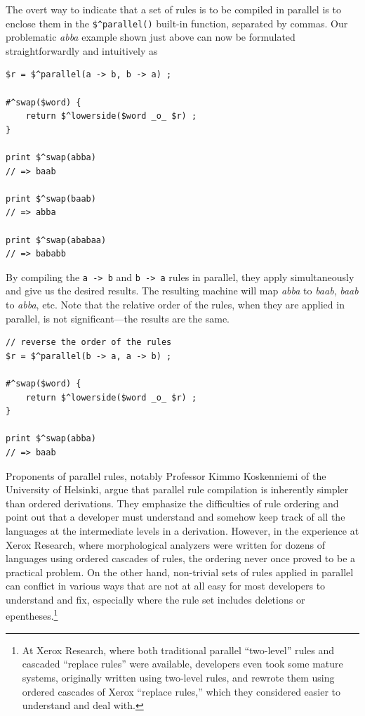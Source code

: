 The overt way to indicate that a set of rules is to be compiled in parallel is to enclose them in the \verb!$^parallel()!
built-in function, separated by commas.  Our problematic \emph{abba} example shown just above
can now be formulated straightforwardly and intuitively as

\begin{Verbatim}
$r = $^parallel(a -> b, b -> a) ;

#^swap($word) {
    return $^lowerside($word _o_ $r) ;
}

print $^swap(abba)
// => baab

print $^swap(baab)
// => abba

print $^swap(ababaa)
// => bababb
\end{Verbatim}

\noindent
By compiling the \texttt{a -> b} and \texttt{b -> a} rules in parallel, they apply simultaneously and give us the desired
results.
The resulting machine will map \emph{abba} to \emph{baab}, \emph{baab} to \emph{abba},
etc.   Note that the relative order of the rules, when they are applied in parallel,
is not significant---the results are the same.

\begin{Verbatim}
// reverse the order of the rules
$r = $^parallel(b -> a, a -> b) ;

#^swap($word) {
    return $^lowerside($word _o_ $r) ;
}

print $^swap(abba)
// => baab
\end{Verbatim}


Proponents of parallel rules, notably Professor Kimmo Koskenniemi of the University of
Helsinki, argue that parallel rule compilation is inherently simpler than ordered
derivations.  They emphasize the difficulties of rule ordering and point out that a
developer must understand and somehow keep track of all the languages at the 
intermediate levels in a
derivation.  However, in the experience at Xerox Research, where morphological analyzers
were written for dozens of languages using ordered cascades of rules, the ordering never
once proved to be a practical problem.  
On the other hand, non-trivial sets of rules applied in parallel can conflict in
various ways that are not at all easy for most developers to understand and fix,
especially where the rule set includes deletions or epentheses.\footnote{At Xerox
	Research, where both traditional parallel ``two-level'' rules and cascaded ``replace
	rules'' were available, developers even took some mature systems, originally written
	using two-level rules, and rewrote them using ordered cascades of Xerox ``replace
rules,'' which they considered easier to understand and deal with.}
	
